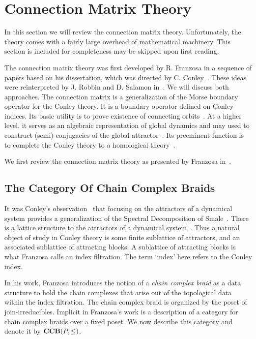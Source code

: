 
\section{Connection Matrix Theory}\label{sec:CMT}

In this section we will review the connection matrix theory.  Unfortunately, the theory comes with a fairly large overhead of mathematical machinery.  This section is included for completeness may be skipped upon first reading.

The connection matrix theory was first developed by R. Franzosa in a sequence of papers based on his dissertation, which was directed by C. Conley~\cite{fran2,fran,fran3}.  These ideas were reinterpreted by J. Robbin and D. Salamon in~\cite{salamon}.  We will discuss both approaches.  The connection matrix is a generalization of the Morse boundary operator for the Conley theory.   It is a boundary operator defined on Conley indices.  Its basic utility is to prove existence of connecting orbits~\cite{mpmw}.  At a higher level, it serves as an algebraic representation of global dynamics and may used to construct (semi)-conjugacies of the global attractor~\cite{dhmo,mcmodels,scalar}. Its preeminent function is to complete the Conley theory to a homological theory~\cite{mc}.  

We first review the connection matrix theory as presented by Franzosa in~\cite{fran}.

\subsection{The Category Of Chain Complex Braids}
It was Conley's observation~\cite{conley} that focusing on the attractors of a dynamical system provides a generalization of the Spectral Decomposition of Smale~\cite[Theorem 6.2]{smale}.  There is a lattice structure to the attractors of a dynamical system~\cite{salamon,lsa,lsa2}.  Thus a natural object of study in Conley theory is some finite sublattice of attractors, and an associated sublattice of attracting blocks.  A sublattice of attracting blocks is what Franzosa calls an index filtration.  The term `index' here refers to the Conley index.

In his work, Franzosa introduces the notion of a {\em chain complex braid} as a data structure to hold the chain complexes that arise out of the topological data within the index filtration.  The chain complex braid is organized by the poset of join-irreducibles.  Implicit in Franzosa's work is a description of a category for chain complex braids over a fixed poset.  We now describe this category and denote it by ${\bf CCB}(P,\leq)$.

